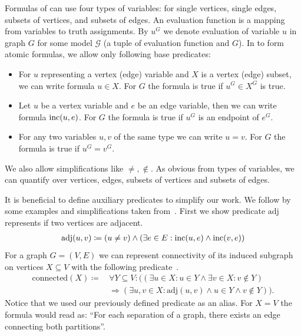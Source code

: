 Formulas of \MSO{} can use four types of variables:
for single vertices, single edges, subsets of vertices, and subsets of edges.
An evaluation function is a mapping from variables to truth assignments.
By \( u^G \) we denote evaluation of variable \( u \) in graph \( G \)
for some model \( \mathcal{G} \) (a tuple of evaluation function and \( G \)).
In \MSO{} to form atomic formulas, we allow only following base predicates:
%
\begin{itemize}
	\item For \( u \) representing a vertex (edge) variable
	      and \( X \) is a vertex (edge) subset,
	      we can write formula \( u \in X \).
	      For \( G \) the formula is true if \( u^G \in X^G \) is true.
	\item Let \( u \) be a vertex variable and \( e \) be an edge variable,
	      then we can write formula \( \text{inc} (u, e) \).
	      For \( G \) the formula is true if \( u^G \) is an endpoint of \( e^G \).
	\item For any two variables \( u, v \) of the same type we can write \( u = v \).
	      For \( G \) the formula is true if \( u^G = v^G \).
\end{itemize}
%
We also allow simplifications like \( \ne, \not\in \).
As obvious from types of variables, we can quantify over vertices, edges,
subsets of vertices and subsets of edges.

It is beneficial to define auxiliary predicates to simplify our work.
We follow by some examples and simplifications taken from~\cite{book_parametrized_algorithms}.
First we show predicate \( \text{adj} \) represents if two vertices are adjacent.
%
\begin{align*}
	\text{adj}(u, v) \coloneqq (u \ne v) \land (\exists e \in E : \text{inc} (u, e) \land \text{inc} (v, e))
\end{align*}
%
For a graph \( G = (V, E) \) we can represent connectivity of its induced subgraph
on vertices \( X \subseteq V \) with the following predicate~\cite{book_parametrized_algorithms}.
%
\begin{align*}
	\text{connected}(X) \coloneqq \, &
	\forall Y \subseteq V : \Big(
	(
	\exists u \in X : u \in Y \land
	\exists v \in X : v \not\in Y
	)
	\\ &
	\Rightarrow
	(
	\exists u, v \in X : \text{adj}(u, v) \land u \in Y \land v \not\in Y
	)\Big).
\end{align*}
%
Notice that we used our previously defined predicate as an alias.
For \( X = V \) the formula would read as:
``For each separation of a graph, there exists an edge connecting both partitions''.


